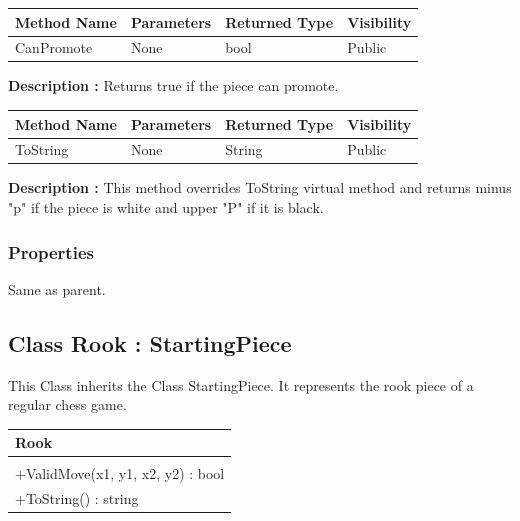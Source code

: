 \documentclass[12pt]{article}
\begin{document}
\begin{table}[H]
    \begin{tabular}{|l|l|l|l|}
    \hline
    \rowcolor[HTML]{EFEFEF} 
    \cellcolor[HTML]{EFEFEF}\textbf{Method Name} & \textbf{Parameters}  & \textbf{Returned Type} & \textbf{Visibility} \\ \hline
    CanPromote                                   & None                 & bool                   & Public              \\ \hline
    \end{tabular}
\end{table}

\textbf{Description :} Returns true if the piece can promote.

\begin{table}[H]
    \begin{tabular}{|l|l|l|l|}
    \hline
    \rowcolor[HTML]{EFEFEF} 
    \cellcolor[HTML]{EFEFEF}\textbf{Method Name} & \textbf{Parameters}  & \textbf{Returned Type} & \textbf{Visibility} \\ \hline
    ToString                                   & None                 & String                   & Public              \\ \hline
    \end{tabular}
\end{table}

\textbf{Description :} This method overrides ToString virtual
method and returns minus "p" if the piece is white and upper "P"
if it is black.

\subsubsection{Properties}

Same as parent.
\newpage


\subsection{Class Rook : StartingPiece}

This Class inherits the Class StartingPiece. It represents the rook 
piece of a regular chess game.
\begin{table}[H]
    \begin{tabular}{|l|}
    \hline
    \cellcolor[HTML]{C0C0C0}\textbf{Rook} \\ \hline
    \cellcolor[HTML]{EFEFEF}                    \\ \hline
    +ValidMove(x1, y1, x2, y2) : bool           \\ \hline
    +ToString() : string                        \\ \hline
    \end{tabular}
\end{table}
\end{document}
